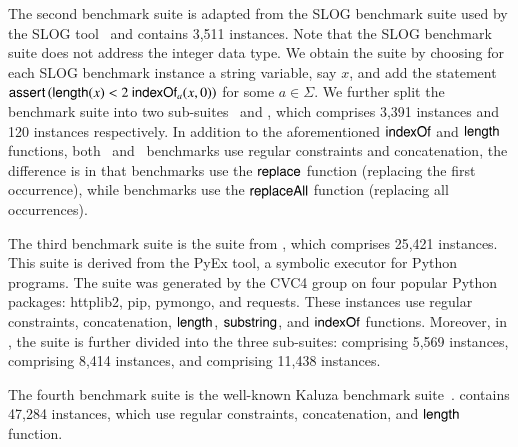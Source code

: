 The second benchmark suite {\slogbench} is adapted from the SLOG benchmark suite used by the SLOG tool~\cite{fang-yu-circuits} and contains 3,511 instances. 
Note that the SLOG benchmark suite does not address the integer data type. We  obtain the {\slogbench} suite by choosing for each SLOG benchmark instance a string variable,
say $x$, and add the statement $\textsf{assert}\left(\mathsf{length}(x) < 2\ \mathsf{indexOf}_{a}(x, 0)\right)$ for some $a \in \Sigma$.
We further split the {\slogbench} benchmark suite into two sub-suites \slogbenchr\ and \slogbenchra, which comprises 3,391 instances and 120 instances respectively. In addition to the aforementioned $\mathsf{indexOf}$ and $\mathsf{length}$ functions, both  \slogbenchr\ and \slogbenchra\ benchmarks use regular constraints and concatenation, the difference is in that {\slogbenchr} benchmarks use the $\mathsf{replace}$ function (replacing the first occurrence), while {\slogbenchra} benchmarks use the $\mathsf{replaceAll}$ function (replacing all occurrences).


The third benchmark suite is the {\pyexbench} suite from \cite{ReynoldsWBBLT17}, which comprises 25,421 instances. 
This suite is derived from the PyEx tool, a symbolic executor for Python programs. The {\pyexbench} suite was generated by the CVC4 group on four popular Python packages: httplib2, pip, pymongo, and requests. These instances use regular constraints, concatenation, $\mathsf{length}$, $\mathsf{substring}$, and $\mathsf{indexOf}$ functions. Moreover, in  \cite{ReynoldsWBBLT17}, the {\pyexbench} suite is further divided into the three sub-suites: {\pyextdbench} comprising 5,569 instances, {\pyexztbench} comprising 8,414 instances, and {\pyexzzbench} comprising 11,438 instances.

The fourth benchmark suite {\kaluzabench} is the well-known Kaluza benchmark suite~\cite{Berkeley-JavaScript}.
{\kaluzabench} contains 47,284 instances, which use regular constraints, concatenation, and $\mathsf{length}$ function.





